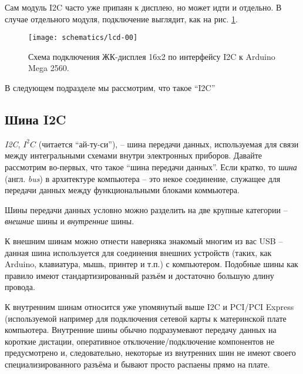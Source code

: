 \documentclass[../sparc.tex]{subfiles}
\begin{document}
Сам модуль I2C часто уже припаян к дисплею, но может идти и отдельно.  В случае
отдельного модуля, подключение выглядит, как на рис. \ref{fig:lcd-00}.

\begin{figure}[ht]
  \centering
  \texttt{[image: schematics/lcd-00]}
  \caption{Схема подключения ЖК-дисплея 16x2 по интерфейсу I2C к Arduino Mega
    2560.}
  \label{fig:lcd-00}
\end{figure}

В следующем подразделе мы рассмотрим, что такое ``I2C''

\subsection{Шина I2C \Star}




\textit{\gls{I2C}}, $I^{2}C$ (читается ``ай-ту-си''), -- шина передачи данных,
используемая для связи между интегральными схемами внутри электронных приборов.
Давайте рассмотрим во-первых, что такое ``шина передачи данных''.  Если кратко,
то \textit{шина} (англ. \textit{bus}) в архитектуре компьютера -- это некое
соединение, служащее для передачи данных между функциональными блоками
коммьютера.

Шины передачи данных условно можно разделить на две крупные категории --
\textit{внешние} шины и \textit{внутренние} шины.

К внешним шинам можно отнести наверняка знакомый многим из вас \gls{USB} --
данная шина используется для соединения внешних устройств (таких, как Arduino,
клавиатура, мышь, принтер и т.п.) с компьютером.  Подобные шины как правило
имеют стандартизированный разъём и достаточно большую длину провода.

К внутренним шинам относится уже упомянутый выше \gls{I2C} и \gls{PCI}/PCI
Express (используемой например для подключения сетевой карты к материнской плате
компьютера.  Внутренние шины обычно подразумевают передачу данных на короткие
дистации, оперативное отключение/подключение компонентов не предусмотрено и,
следовательно, некоторые из внутренних шин не имеют своего специализированного
разъёма и бывают просто распаены прямо на плате.
\end{document}
